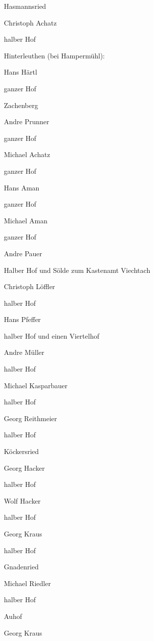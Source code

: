 Hasmannsried

Christoph Achatz

halber Hof

Hinterleuthen (bei Hampermühl):

Hans Härtl

ganzer Hof

Zachenberg

Andre Prunner

ganzer Hof



Michael Achatz

ganzer Hof



Hans Aman

ganzer Hof



Michael Aman

ganzer Hof



Andre Pauer

Halber Hof und Sölde zum Kastenamt Viechtach



Christoph Löffler

halber Hof



Hans Pfeffer

halber Hof und einen Viertelhof



Andre Müller

halber Hof



Michael Kasparbauer

halber Hof



Georg Reithmeier

halber Hof

Köckersried

Georg Hacker

halber Hof



Wolf Hacker

halber Hof



Georg Kraus

halber Hof

Gnadenried

Michael Riedler

halber Hof

Auhof

Georg Kraus

